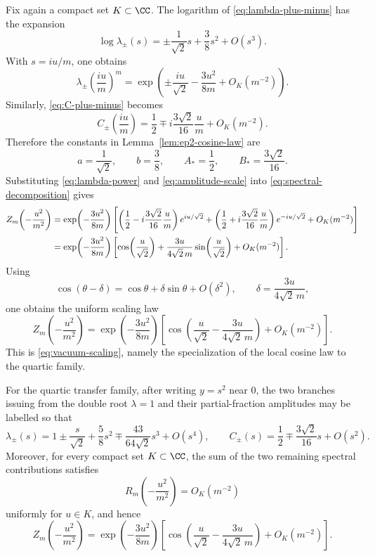 Fix again a compact set $K\subset\CC$.
The logarithm of \eqref{eq:lambda-plus-minus} has the expansion
\begin{equation}\label{eq:log-lambda-plus-minus}
\log \lambda_\pm(s)
=
\pm \frac{1}{\sqrt2}s+\frac38 s^2+O(s^3).
\end{equation}
With $s=iu/m$, one obtains
\begin{equation}\label{eq:lambda-power}
\lambda_\pm\!\left(\frac{iu}{m}\right)^m
=
\exp\!\left(
\pm \frac{iu}{\sqrt2}-\frac{3u^2}{8m}+O_K(m^{-2})
\right).
\end{equation}
Similarly, \eqref{eq:C-plus-minus} becomes
\begin{equation}\label{eq:amplitude-scale}
C_\pm\!\left(\frac{iu}{m}\right)
=
\frac12\mp i\frac{3\sqrt2}{16}\frac{u}{m}+O_K(m^{-2}).
\end{equation}
Therefore the constants in Lemma~\ref{lem:ep2-cosine-law} are
\begin{equation}\label{eq:appendix-cosine-constants-repeated}
a=\frac{1}{\sqrt2},
\qquad
b=\frac38,
\qquad
A_*=\frac12,
\qquad
B_*=\frac{3\sqrt2}{16}.
\end{equation}
Substituting \eqref{eq:lambda-power} and \eqref{eq:amplitude-scale} into \eqref{eq:spectral-decomposition} gives
\begin{align}
Z_m\!\left(-\frac{u^2}{m^2}\right)
&=
\exp\!\left(-\frac{3u^2}{8m}\right)
\Biggl[
\left(\frac12-i\frac{3\sqrt2}{16}\frac{u}{m}\right)e^{iu/\sqrt2}
+\left(\frac12+i\frac{3\sqrt2}{16}\frac{u}{m}\right)e^{-iu/\sqrt2}
+O_K(m^{-2})
\Biggr] \notag\\
&=
\exp\!\left(-\frac{3u^2}{8m}\right)
\left[
\cos\!\left(\frac{u}{\sqrt2}\right)
+\frac{3u}{4\sqrt2\,m}\sin\!\left(\frac{u}{\sqrt2}\right)
+O_K(m^{-2})
\right].\label{eq:appendix-scaling}
\end{align}
Using
\[
\cos(\theta-\delta)=\cos\theta+\delta\sin\theta+O(\delta^2),
\qquad
\delta=\frac{3u}{4\sqrt2\,m},
\]
one obtains the uniform scaling law
\begin{equation}\label{eq:appendix-shifted-cosine}
Z_m\!\left(-\frac{u^2}{m^2}\right)
=
\exp\!\left(-\frac{3u^2}{8m}\right)
\left[
\cos\!\left(\frac{u}{\sqrt2}-\frac{3u}{4\sqrt2\,m}\right)
+ O_K(m^{-2})
\right].
\end{equation}
This is \eqref{eq:vacuum-scaling}, namely the specialization of the local cosine law to the quartic family.

\begin{proposition}\label{prop:endpoint-expansion-package}
For the quartic transfer family, after writing \(y=s^2\) near \(0\), the two branches issuing from the double root \(\lambda=1\) and their partial-fraction amplitudes may be labelled so that
\[
\lambda_\pm(s)
=
1\pm \frac{s}{\sqrt2}+\frac58s^2\mp\frac{43}{64\sqrt2}s^3+O(s^4),
\qquad
C_\pm(s)=\frac12\mp\frac{3\sqrt2}{16}s+O(s^2).
\]
Moreover, for every compact set \(K\subset\CC\), the sum of the two remaining spectral contributions satisfies
\[
R_m\!\left(-\frac{u^2}{m^2}\right)=O_K(m^{-2})
\]
uniformly for \(u\in K\), and hence
\[
Z_m\!\left(-\frac{u^2}{m^2}\right)
=
\exp\!\left(-\frac{3u^2}{8m}\right)
\left[
\cos\!\left(\frac{u}{\sqrt2}-\frac{3u}{4\sqrt2\,m}\right)
+O_K(m^{-2})
\right].
\]
\end{proposition}

